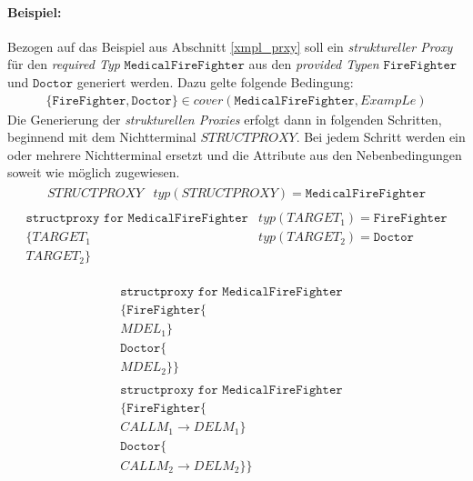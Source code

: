 \documentclass[a4paper,12pt]{article}
\begin{document}
\paragraph{Beispiel:}
Bezogen auf das Beispiel aus Abschnitt \ref{xmpl_prxy} soll ein \emph{struktureller Proxy} für den \emph{required Typ} $\texttt{MedicalFireFighter}$ aus den \emph{provided Typen} $\texttt{FireFighter}$ und $\texttt{Doctor}$ generiert werden. Dazu gelte folgende Bedingung:
\begin{gather*}
	\text{\{}\texttt{FireFighter},\texttt{Doctor} \text{\}} \in \mathit{cover(\texttt{MedicalFireFighter}, ExampLe)}
\end{gather*}
Die Generierung der \emph{strukturellen Proxies} erfolgt dann in folgenden Schritten, beginnend mit dem Nichtterminal $\mathit{STRUCTPROXY}$. Bei jedem Schritt werden ein oder mehrere Nichtterminal ersetzt und die Attribute aus den Nebenbedingungen soweit wie möglich zugewiesen.
\begin{gather*}
\begin{array}{l|l}
	\mathit{STRUCTPROXY} & \mathit{typ(STRUCTPROXY)} = \texttt{MedicalFireFighter}
\end{array}
\end{gather*}
\begin{gather*}
\begin{array}{l|l}
	\texttt{structproxy for MedicalFireFighter} & \mathit{typ(TARGET_1)} = \texttt{FireFighter}\\
	\texttt{\{} \mathit{TARGET_1} & \mathit{typ(TARGET_2)} = \texttt{Doctor} \\
	 \mathit{TARGET_2} \text{\}} &
\end{array}
\end{gather*}

\begin{gather*}
\begin{array}{l|l}
\texttt{structproxy for MedicalFireFighter} & \\
\texttt{\{} \texttt{FireFighter} \texttt{\{} & \\
\mathit{MDEL_1}\texttt{\}} & \\
\texttt{Doctor} \texttt{\{} & \\
\mathit{MDEL_2}\texttt{\}} \text{\}} &
\end{array}
\end{gather*}
\begin{gather*}
\begin{array}{l|l}
\texttt{structproxy for MedicalFireFighter} & \\
\texttt{\{} \texttt{FireFighter} \texttt{\{} & \\
\mathit{CALLM_1} \rightarrow \mathit{DELM_1}\texttt{\}} & \\
\texttt{Doctor} \texttt{\{} & \\
\mathit{CALLM_2} \rightarrow \mathit{DELM_2}\texttt{\}} \text{\}} &
\end{array}
\end{gather*}
\end{document}
